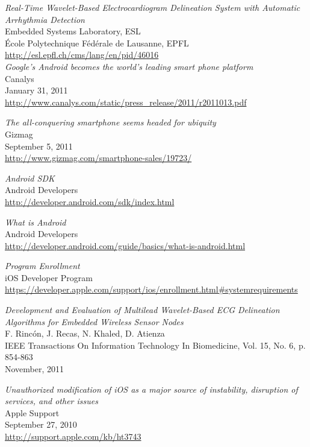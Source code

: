 \begin{thebibliography}{widest-label}

 	\emph{Real-Time Wavelet-Based Electrocardiogram Delineation System with Automatic Arrhythmia Detection}\\
 	Embedded Systems Laboratory, ESL\\
 	École Polytechnique Fédérale de Lausanne, EPFL\\
 	\url{http://esl.epfl.ch/cms/lang/en/pid/46016}\\
	
	\emph{Google’s Android becomes the world’s leading smart phone platform}\\
	Canalys\\
	January 31, 2011\\
	\url{http://www.canalys.com/static/press_release/2011/r2011013.pdf}

	\emph{The all-conquering smartphone seems headed for ubiquity}\\
	Gizmag\\
	September 5, 2011\\
	\url{http://www.gizmag.com/smartphone-sales/19723/}

	\emph{Android SDK}\\
	Android Developers\\
	\url{http://developer.android.com/sdk/index.html}
	
	\emph{What is Android}\\
	Android Developers\\
	\url{http://developer.android.com/guide/basics/what-is-android.html}
	
	\emph{Program Enrollment}\\
	iOS Developer Program\\
	\url{https://developer.apple.com/support/ios/enrollment.html#systemrequirements}
	
	\emph{Development and Evaluation of Multilead Wavelet-Based ECG Delineation Algorithms for Embedded Wireless
		Sensor Nodes}\\
	F. Rincón, J. Recas, N. Khaled, D. Atienza\\
	IEEE Transactions On Information Technology In Biomedicine, Vol. 15, No. 6, p. 854-863\\
	November, 2011
	
	\emph{Unauthorized modification of iOS as a major source of instability, disruption of services, and other issues}\\
	Apple Support\\
	September 27, 2010\\
	\url{http://support.apple.com/kb/ht3743}
	

\end{thebibliography}
